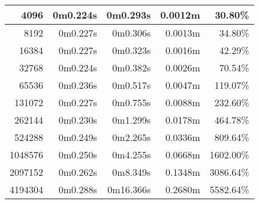 \documentclass[documentation.tex]{subfiles}
\begin{document}
\begin{longtable}{|r|r|r|r|r|}
        4096                                                & 0m0.224s                      & 0m0.293s                          & {\color[HTML]{32CB00} 0.0012m}    & {\color[HTML]{32CB00} 30.80\%}     \\ \hline
        8192                                                & 0m0.227s                      & 0m0.306s                          & {\color[HTML]{32CB00} 0.0013m}    & {\color[HTML]{32CB00} 34.80\%}     \\ \hline
        16384                                               & 0m0.227s                      & 0m0.323s                          & {\color[HTML]{32CB00} 0.0016m}    & {\color[HTML]{32CB00} 42.29\%}     \\ \hline
        32768                                               & 0m0.224s                      & 0m0.382s                          & {\color[HTML]{32CB00} 0.0026m}    & {\color[HTML]{32CB00} 70.54\%}     \\ \hline
        65536                                               & 0m0.236s                      & 0m0.517s                          & {\color[HTML]{32CB00} 0.0047m}    & {\color[HTML]{32CB00} 119.07\%}    \\ \hline
        131072                                              & 0m0.227s                      & 0m0.755s                          & {\color[HTML]{32CB00} 0.0088m}    & {\color[HTML]{32CB00} 232.60\%}    \\ \hline
        262144                                              & 0m0.230s                      & 0m1.299s                          & {\color[HTML]{32CB00} 0.0178m}    & {\color[HTML]{32CB00} 464.78\%}    \\ \hline
        524288                                              & 0m0.249s                      & 0m2.265s                          & {\color[HTML]{32CB00} 0.0336m}    & {\color[HTML]{32CB00} 809.64\%}    \\ \hline
        1048576                                             & 0m0.250s                      & 0m4.255s                          & {\color[HTML]{32CB00} 0.0668m}    & {\color[HTML]{32CB00} 1602.00\%}   \\ \hline
        2097152                                             & 0m0.262s                      & 0m8.349s                          & {\color[HTML]{32CB00} 0.1348m}    & {\color[HTML]{32CB00} 3086.64\%}   \\ \hline
        4194304                                             & 0m0.288s                      & 0m16.366s                         & {\color[HTML]{32CB00} 0.2680m}    & {\color[HTML]{32CB00} 5582.64\%}   \\ \hline

\end{longtable}
\end{document}

